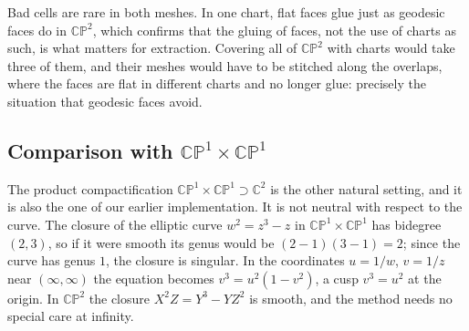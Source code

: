 \documentclass[11pt]{article}
\theoremstyle{plain}
\theoremstyle{definition}
\theoremstyle{remark}
\newcommand{\CP}{\mathbb{CP}}
\newcommand{\C}{\mathbb{C}}
\begin{document}
Bad cells are rare in both meshes. In one chart, flat faces glue just as
geodesic faces do in $\CP^2$, which confirms that the gluing of faces, not
the use of charts as such, is what matters for extraction. Covering all
of $\CP^2$ with charts would take three of them, and their meshes would
have to be stitched along the overlaps, where the faces are flat in
different charts and no longer glue: precisely the situation that
geodesic faces avoid.

\subsection{Comparison with \texorpdfstring{$\CP^1\times\CP^1$}{CP1 x CP1}}
\label{sec:exp-s2s2}

The product compactification $\CP^1\times\CP^1\supset\C^2$ is the other
natural setting, and it is also the one of our earlier implementation. It
is not neutral with respect to the curve. The closure of the elliptic curve
$w^2=z^3-z$ in $\CP^1\times\CP^1$ has bidegree $(2,3)$, so if it were smooth
its genus would be $(2-1)(3-1)=2$; since the curve has genus $1$, the
closure is singular. In the coordinates $u=1/w$, $v=1/z$ near
$(\infty,\infty)$ the equation becomes $v^3=u^2(1-v^2)$, a cusp $v^3=u^2$
at the origin. In $\CP^2$ the closure $X^2Z=Y^3-YZ^2$ is smooth, and the
method needs no special care at infinity.
\end{document}
